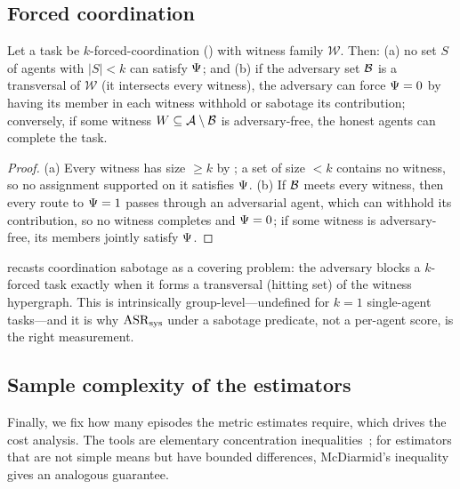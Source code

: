 \subsection{Forced coordination}
\label{sec:theory-forced}
\begin{proposition}
\label{prop:forced}
Let a task be $k$-forced-coordination () with witness family
$\mathcal{W}$. Then: (a) no set $S$ of agents with $|S|<k$ can satisfy $\Psi$; and
(b) if the adversary set $\mathcal{B}$ is a transversal of $\mathcal{W}$ (it intersects every
witness), the adversary can force $\Psi=0$ by having its member in each witness
withhold or sabotage its contribution; conversely, if some witness $W\subseteq\mathcal{A}\setminus\mathcal{B}$
is adversary-free, the honest agents can complete the task.
\end{proposition}
\begin{proof}
(a) Every witness has size $\ge k$ by ; a set of size $<k$ contains no
witness, so no assignment supported on it satisfies $\Psi$. (b) If $\mathcal{B}$ meets
every witness, then every route to $\Psi=1$ passes through an adversarial agent, which
can withhold its contribution, so no witness completes and $\Psi=0$; if some witness is
adversary-free, its members jointly satisfy $\Psi$.
\end{proof}

\begin{remark}
 recasts coordination sabotage as a covering problem: the adversary
blocks a $k$-forced task exactly when it forms a transversal (hitting set) of the witness
hypergraph. This is intrinsically group-level---undefined for $k=1$ single-agent
tasks---and it is why $\mathrm{ASR}_{\mathrm{sys}}$ under a sabotage predicate, not a per-agent score, is the
right measurement.
\end{remark}

\subsection{Sample complexity of the estimators}
\label{sec:theory-sample}
Finally, we fix how many episodes the metric estimates require, which drives the cost
analysis. The tools are elementary concentration inequalities~\cite{boucheron2013concentration};
for estimators that are not simple means but have bounded differences, McDiarmid's
inequality~\cite{mcdiarmid1989bounded} gives an analogous guarantee.

